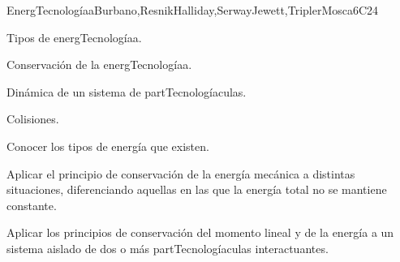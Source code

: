 \begin{syllabus}
\begin{unit}{}{EnergTecnologíaa}{Burbano,ResnikHalliday,SerwayJewett,TriplerMosca}{6}{C24}
\begin{topics}
      \item Tipos de energTecnologíaa.
      \item Conservación de la energTecnologíaa. 
      \item Dinámica de un sistema de partTecnologíaculas.
      \item Colisiones.
  \end{topics}

   \begin{learningoutcomes}
      \item Conocer los tipos de energía que existen.
      \item Aplicar el principio de conservación de la energía mecánica a distintas situaciones, diferenciando aquellas en las que la energía total no se mantiene constante. 
      \item Aplicar los principios de conservación del momento lineal y de la energía a un sistema aislado de dos o más partTecnologíaculas interactuantes.
   \end{learningoutcomes}
\end{unit}

\begin{coursebibliography}
\end{coursebibliography}

\end{syllabus}
